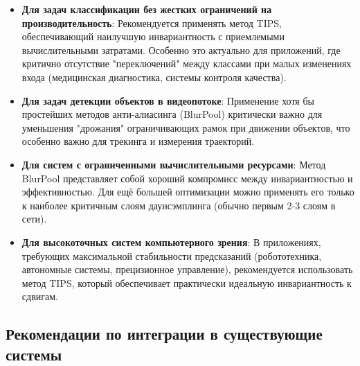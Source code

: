 \begin{itemize}
    \item \textbf{Для задач классификации без жестких ограничений на производительность}: Рекомендуется применять метод TIPS, обеспечивающий наилучшую инвариантность с приемлемыми вычислительными затратами. Особенно это актуально для приложений, где критично отсутствие "переключений" между классами при малых изменениях входа (медицинская диагностика, системы контроля качества).
    
    \item \textbf{Для задач детекции объектов в видеопотоке}: Применение хотя бы простейших методов анти-алиасинга (BlurPool) критически важно для уменьшения "дрожания" ограничивающих рамок при движении объектов, что особенно важно для трекинга и измерения траекторий.
    
    \item \textbf{Для систем с ограниченными вычислительными ресурсами}: Метод BlurPool представляет собой хороший компромисс между инвариантностью и эффективностью. Для ещё большей оптимизации можно применять его только к наиболее критичным слоям даунсэмплинга (обычно первым 2-3 слоям в сети).
    
    \item \textbf{Для высокоточных систем компьютерного зрения}: В приложениях, требующих максимальной стабильности предсказаний (робототехника, автономные системы, прецизионное управление), рекомендуется использовать метод TIPS, который обеспечивает практически идеальную инвариантность к сдвигам.
\end{itemize}

\subsection{Рекомендации по интеграции в существующие системы}
\label{discussion:recommendations:integration}

